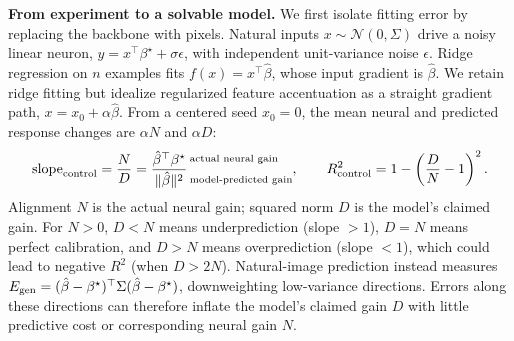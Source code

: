 \documentclass[12pt,a4paper]{article}
\newcommand{\head}[1]{\par\noindent\textbf{#1}\enspace\ignorespaces}
\newcommand{\bh}{\hat\beta}
\newcommand{\bt}{\beta^\star}
\begin{document}
\head{From experiment to a solvable model.}
We first isolate fitting error by replacing the backbone with pixels. Natural inputs $x\sim\mathcal N(0,\Sigma)$ drive a noisy linear neuron, $y=x^\top\bt+\sigma\epsilon$, with independent unit-variance noise $\epsilon$. Ridge regression on $n$ examples fits $f(x)=x^\top\bh$, whose input gradient is $\bh$. We retain ridge fitting but idealize regularized feature accentuation as a straight gradient path, $x=x_0+\alpha\bh$. From a centered seed $x_0=0$, the mean neural and predicted response changes are $\alpha N$ and $\alpha D$:
\begin{equation}
\mathrm{slope}_{\rm control}=\frac ND=
\frac{\bh^\top\bt}{\|\bh\|^2}\,
\begin{subarray}{l}
\text{actual neural gain}\\[8pt]
\text{model-predicted gain}
\end{subarray},
\qquad R^2_{\rm control}=1-\left(\frac DN-1\right)^2.
\label{eq:geometry}
\end{equation}
Alignment $N$ is the actual neural gain; squared norm $D$ is the model's claimed gain. For $N>0$, $D<N$ means underprediction (slope $>1$), $D=N$ means perfect calibration, and $D>N$ means overprediction (slope $<1$), which could lead to negative $R^2$ (when $D>2N$). Natural-image prediction instead measures $E_{\rm gen}=(\bh-\bt)^\top\Sigma(\bh-\bt)$, downweighting low-variance directions. Errors along these directions can therefore inflate the model's claimed gain $D$ with little predictive cost or corresponding neural gain $N$.
\end{document}
